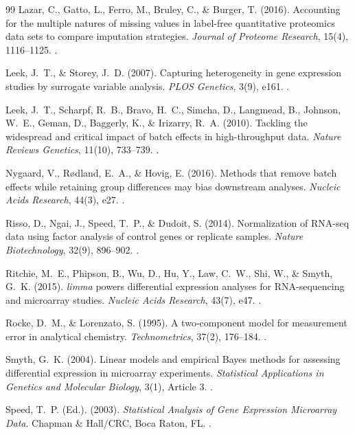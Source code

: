 \documentclass[11pt,oneside]{book}
\begin{document}
\begin{thebibliography}{99}
Lazar, C., Gatto, L., Ferro, M., Bruley, C., \& Burger, T. (2016). Accounting for the multiple natures of missing values in label-free quantitative proteomics data sets to compare imputation strategies. \textit{Journal of Proteome Research}, 15(4), 1116--1125. .

Leek, J.~T., \& Storey, J.~D. (2007). Capturing heterogeneity in gene expression studies by surrogate variable analysis. \textit{PLOS Genetics}, 3(9), e161. .

Leek, J.~T., Scharpf, R.~B., Bravo, H.~C., Simcha, D., Langmead, B., Johnson, W.~E., Geman, D., Baggerly, K., \& Irizarry, R.~A. (2010). Tackling the widespread and critical impact of batch effects in high-throughput data. \textit{Nature Reviews Genetics}, 11(10), 733--739. .

Nygaard, V., R\o dland, E.~A., \& Hovig, E. (2016). Methods that remove batch effects while retaining group differences may bias downstream analyses. \textit{Nucleic Acids Research}, 44(3), e27. .

Risso, D., Ngai, J., Speed, T.~P., \& Dudoit, S. (2014). Normalization of RNA-seq data using factor analysis of control genes or replicate samples. \textit{Nature Biotechnology}, 32(9), 896--902. .

Ritchie, M.~E., Phipson, B., Wu, D., Hu, Y., Law, C.~W., Shi, W., \& Smyth, G.~K. (2015). \textit{limma} powers differential expression analyses for RNA-sequencing and microarray studies. \textit{Nucleic Acids Research}, 43(7), e47. .

Rocke, D.~M., \& Lorenzato, S. (1995). A two-component model for measurement error in analytical chemistry. \textit{Technometrics}, 37(2), 176--184. .

Smyth, G.~K. (2004). Linear models and empirical Bayes methods for assessing differential expression in microarray experiments. \textit{Statistical Applications in Genetics and Molecular Biology}, 3(1), Article 3. .

Speed, T.~P. (Ed.). (2003). \textit{Statistical Analysis of Gene Expression Microarray Data}. Chapman \& Hall/CRC, Boca Raton, FL. .


\end{thebibliography}
\end{document}
